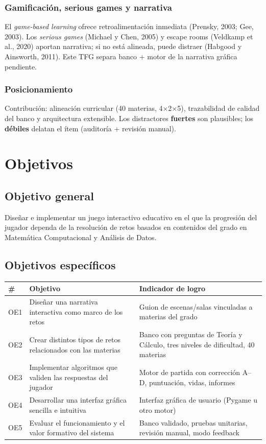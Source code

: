 \documentclass[11pt,a4paper]{article}
\begin{document}
\subsubsection{Gamificación, serious games y narrativa}

El \textit{game-based learning} ofrece retroalimentación inmediata (Prensky, 2003; Gee, 2003). Los \textit{serious games} (Michael y Chen, 2005) y escape rooms (Veldkamp et al., 2020) aportan narrativa; si no está alineada, puede distraer (Habgood y Ainsworth, 2011). Este TFG separa banco + motor de la narrativa gráfica pendiente.

\subsubsection{Posicionamiento}

Contribución: alineación curricular (40 materias, 4×2×5), trazabilidad de calidad del banco y arquitectura extensible. Los distractores \textbf{fuertes} son plausibles; los \textbf{débiles} delatan el ítem (auditoría + revisión manual).

\section{Objetivos}

\subsection{Objetivo general}

Diseñar e implementar un juego interactivo educativo en el que la progresión del jugador dependa de la resolución de retos basados en contenidos del grado en Matemática Computacional y Análisis de Datos.

\subsection{Objetivos específicos}

{\small\setlength{\tabcolsep}{4pt}%
\begin{tabular}{@{}l>{\raggedright\arraybackslash}p{3.4cm}>{\raggedright\arraybackslash}p{7.8cm}@{}}
\toprule
\textbf{\#} & \textbf{Objetivo} & \textbf{Indicador de logro} \\
\midrule
OE1 & Diseñar una narrativa interactiva como marco de los retos & Guion de escenas/salas vinculadas a materias del grado \\
OE2 & Crear distintos tipos de retos relacionados con las materias & Banco con preguntas de Teoría y Cálculo, tres niveles de dificultad, 40 materias \\
OE3 & Implementar algoritmos que validen las respuestas del jugador & Motor de partida con corrección A--D, puntuación, vidas, informes \\
OE4 & Desarrollar una interfaz gráfica sencilla e intuitiva & Interfaz gráfica de usuario (Pygame u otro motor) \\
OE5 & Evaluar el funcionamiento y el valor formativo del sistema & Banco validado, pruebas unitarias, revisión manual, modo feedback \\
\bottomrule
\end{tabular}}
\end{document}
